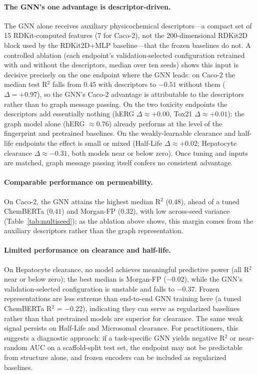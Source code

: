 \documentclass[journal]{IEEEtran}
\begin{document}
\paragraph{The GNN's one advantage is descriptor-driven.}
The GNN alone receives auxiliary physicochemical descriptors---a compact set of 15 RDKit-computed features (7 for Caco-2), not the 200-dimensional RDKit2D block used by the RDKit2D+MLP baseline---that the frozen baselines do not. A controlled ablation (each endpoint's validation-selected configuration retrained with and without the descriptors, median over ten seeds) shows this input is decisive precisely on the one endpoint where the GNN leads: on Caco-2 the median test R$^2$ falls from $0.45$ with descriptors to $-0.51$ without them ($\Delta = +0.97$), so the GNN's Caco-2 advantage is attributable to the descriptors rather than to graph message passing. On the two toxicity endpoints the descriptors add essentially nothing (hERG $\Delta \approx +0.00$, Tox21 $\Delta \approx +0.01$): the graph model alone (hERG $\approx 0.76$) already performs at the level of the fingerprint and pretrained baselines. On the weakly-learnable clearance and half-life endpoints the effect is small or mixed (Half-Life $\Delta \approx +0.02$; Hepatocyte clearance $\Delta \approx -0.31$, both models near or below zero). Once tuning and inputs are matched, graph message passing itself confers no consistent advantage.

\paragraph{Comparable performance on permeability.}
On Caco-2, the GNN attains the highest median R$^2$ ($0.48$), ahead of a tuned ChemBERTa ($0.41$) and Morgan-FP ($0.32$), with low across-seed variance (Table~\ref{tab:multiseed}); as the ablation above shows, this margin comes from the auxiliary descriptors rather than the graph representation.

\paragraph{Limited performance on clearance and half-life.}
On Hepatocyte clearance, no model achieves meaningful predictive power (all R$^2$ near or below zero); the best median is Morgan-FP ($-$0.02), while the GNN's validation-selected configuration is unstable and falls to $-$0.37. Frozen representations are less extreme than end-to-end GNN training here (a tuned ChemBERTa R$^2$ = $-$0.22), indicating they can serve as regularized baselines rather than that pretrained models are superior for clearance. The same weak signal persists on Half-Life and Microsomal clearance. For practitioners, this suggests a diagnostic approach: if a task-specific GNN yields negative R$^2$ or near-random AUC on a scaffold-split test set, the endpoint may not be predictable from structure alone, and frozen encoders can be included as regularized baselines.
\end{document}
